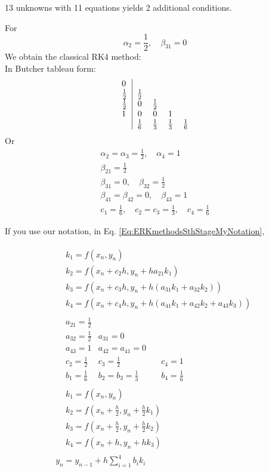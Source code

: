 \documentclass[10pt]{amsart}
\begin{document}
\begin{multicols*}{2}
13 unknowns with 11 equations yields 2 additional conditions.

For
\[
\alpha_2 = \frac{1}{2}, \quad \beta_{31} =0 
\]
We obtain the classical RK4 method: \\

In Butcher tableau form:
\[
\begin{tabular}{ l|c c c c }
	0 & & & &  \\
	$\frac{1}{2}$ & $\frac{1}{2}$ &  & &  \\ 
	$\frac{1}{2}$ & $0$ & $\frac{1}{2}$ & &  \\ 
	$1$ & $0$ & $0$ & 1 &  \\
	& $\frac{1}{6}$ & $\frac{1}{3}$ & $\frac{1}{3}$ & $\frac{1}{6}$  \\
\end{tabular}
\]
Or
\[
\begin{gathered}
	\alpha_2 = \alpha_3 = \frac{1}{2}, \quad \alpha_4 = 1 \\
	\beta_{21} = \frac{1}{2} \\
	\beta_{31} = 0, \quad \beta_{32} = \frac{1}{2} \\
	\beta_{41} = \beta_{42} = 0, \quad \beta_{43}=1 \\
	c_1 = \frac{1}{6}, \quad c_2 = c_3 = \frac{1}{3}, \quad c_4 = \frac{1}{6}
\end{gathered}
\]

If you use our notation, in Eq. \ref{Eq:ERKmethodsSthStageMyNotation}, 

\begin{equation}
\begin{gathered}
	\begin{aligned}
		& k_1 = f(x_n, y_n) \\
		& k_2 = f(x_n + c_2h, y_n + ha_{21}k_1) \\
		& k_3 = f(x_n + c_3h , y_n + h (a_{31} k_1+ a_{32}k_2)) \\
		& k_4 = f(x_n + c_4h, y_n + h(a_{41} k_1 + a_{42} k_2 + a_{43}k_3))
	\end{aligned} \\
\begin{aligned}
	& a_{21} = \frac{1}{2} & & \\
	& a_{32} = \frac{1}{2} & a_{31} = 0 & \\
	& a_{43} = 1 & a_{42} = a_{41} = 0 & \\
	& c_2 = \frac{1}{2} & c_3 = \frac{1}{2} & \quad c_4 = 1 \\ 
	& b_1 = \frac{1}{6} & b_2 = b_3 = \frac{1}{3} & \quad b_4 = \frac{1}{6}
\end{aligned} \\
\begin{aligned}
	& k_1 = f(x_n, y_n) \\
	& k_2 = f(x_n + \frac{h}{2}, y_n + \frac{h}{2} k_1) \\
	& k_3 = f(x_n + \frac{h}{2}, y_n + \frac{h}{2} k_2) \\
	& k_4 = f(x_n + h, y_n + hk_3)
\end{aligned} \\
y_n = y_{n-1} + h \sum_{i=1}^4 b_i k_i
\end{gathered}
\end{equation}



\end{multicols*}
\end{document}
